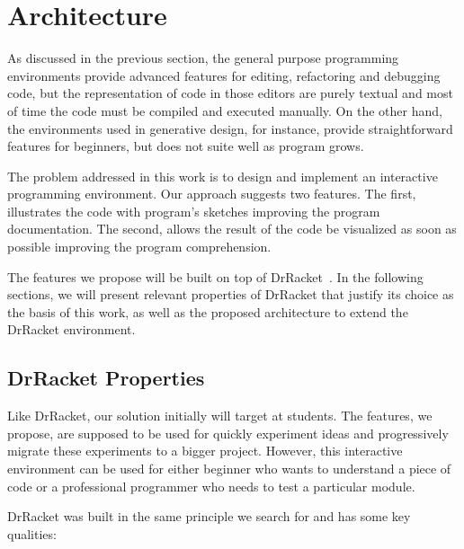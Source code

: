 
% 
% 

\section{Architecture}
\label{sec:arch}

As discussed in the previous section, the general purpose programming environments provide advanced features for editing, refactoring and debugging code, but the representation of code in those editors are purely textual and most of time the code must be compiled and executed manually. On the other hand, the environments used in generative design, for instance, provide straightforward features for beginners, but does not suite well as program grows.

The problem addressed in this work is to design and implement an interactive programming environment. Our approach suggests two features. The first, illustrates the code with program's sketches improving the program documentation. The second, allows the result of the code be visualized as soon as possible improving the program comprehension.

The features we propose will be built on top of DrRacket~\cite{findler2002drscheme}. In the following sections, we will present relevant properties of DrRacket that justify its choice as the basis of this work, as well as the proposed architecture to extend the DrRacket environment.

\subsection{DrRacket Properties}

Like DrRacket, our solution initially will target at students. The features, we propose, are supposed to be used for quickly experiment ideas and progressively migrate these experiments to a bigger project. However, this interactive environment can be used for either beginner who wants to understand a piece of code or a professional programmer who needs to test a particular module.

DrRacket was built in the same principle we search for and has some key qualities:

